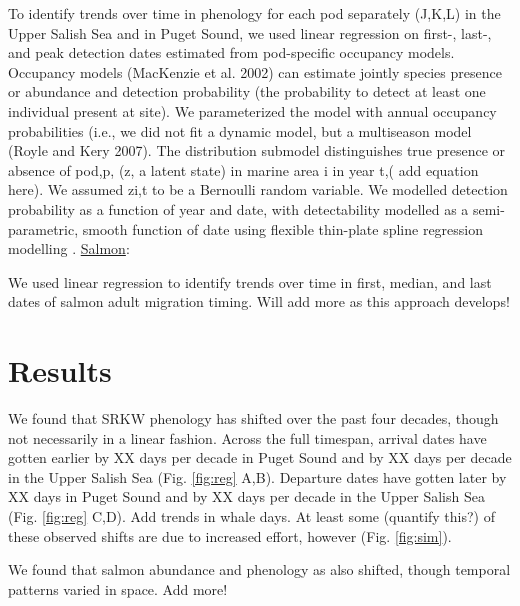 \documentclass{article}
\begin{document}
\par To identify trends over time in phenology for each pod separately (J,K,L) in the Upper Salish Sea and in Puget Sound, we used linear regression on first-, last-, and peak detection dates estimated from pod-specific occupancy models. Occupancy models (MacKenzie et al. 2002) can estimate jointly species presence or abundance and detection probability (the probability to detect at least one individual present at site). We parameterized the model with annual occupancy probabilities (i.e., we did not fit a dynamic model, but a multiseason model (Royle and Kery 2007). The distribution submodel distinguishes true presence or absence of pod,p, (z, a latent state) in marine area i in year t,( add equation here). We assumed zi,t to be a Bernoulli random variable. We modelled detection probability as a function of year and date, with detectability modelled as a semi-parametric, smooth function of date using flexible thin-plate spline regression modelling \citep{strebel2014}. 
\underline{Salmon}:
\par We used linear regression to identify trends over time in first, median, and last dates of salmon adult migration timing. Will add more as this approach develops!

\section*{Results}
\par We found that SRKW phenology has shifted over the past four decades, though not necessarily in a linear fashion. Across the full timespan, arrival dates have gotten earlier by XX days per decade in Puget Sound and by XX days per decade in the Upper Salish Sea (Fig. \ref{fig:reg} A,B). 
Departure dates have gotten later by XX days in Puget Sound and by XX days per decade in the Upper Salish Sea (Fig. \ref{fig:reg} C,D). Add trends in whale days. At least some (quantify this?) of these observed shifts are due to increased effort, however (Fig. \ref{fig:sim}).
\par We found that salmon abundance and phenology as also shifted, though temporal patterns varied in space. Add more!
\end{document}
